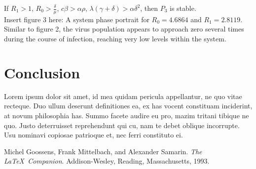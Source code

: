 \documentclass{article}
\begin{document}
If $R_{1} > 1$, $R_{0} > \frac{\delta}{\mu}$, $c \beta > \alpha \rho$, $\lambda (\gamma + \delta) > \alpha \delta^2$, then $P_{3}$ is stable.\\

Insert figure 3 here: A system phase portrait for $R_{0} = 4.6864$ and $R_{1} = 2.8119$.\\
Similar to figure 2, the virus population appears to approach zero several times during the course of infection, reaching very low levels within the system.


\section{Conclusion}
\label{sub:Conclusion}
Lorem ipsum dolor sit amet, id mea quidam pericula appellantur, ne quo vitae recteque. Duo ullum deserunt definitiones ea, ex has vocent constituam inciderint, at novum philosophia has. Summo facete audire eu pro, mazim tritani tibique ne quo. Justo deterruisset reprehendunt qui cu, nam te debet oblique incorrupte. Usu nominavi copiosae patrioque et, nec ferri constituto ei.



\begin{thebibliography}{9}
Michel Goossens, Frank Mittelbach, and Alexander Samarin. 
\textit{The \LaTeX\ Companion}. 
Addison-Wesley, Reading, Massachusetts, 1993.
\end{thebibliography}
\end{document}
